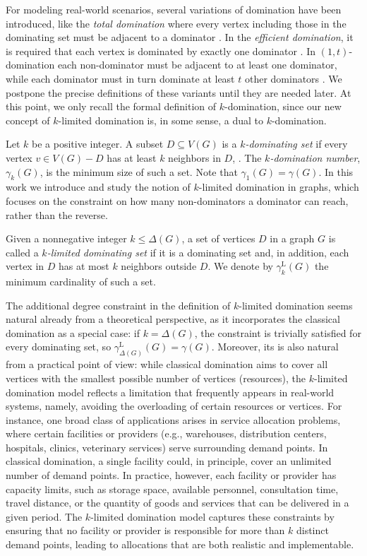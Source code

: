\documentclass[11pt]{article}
\newcommand{\gammakL}{\gamma_k^{\mathrm L}}
\begin{document}
For modeling real-world scenarios, several variations of domination have been introduced, like the \textit{total domination} where every vertex including those in the dominating set must be adjacent to a dominator \cite{MA_Henning}. In the \textit{efficient domination}, it is required that each vertex is dominated by exactly one dominator \cite{HHH4, kpy}. In $(1,t)$-domination each non-dominator must be adjacent to at least one dominator, while each dominator must in turn dominate at least $t$
other dominators \cite{fakhran, favaron}.
We postpone the precise definitions of these variants until they are needed later. At this point, we only recall the formal definition of $k$-domination, since our new concept of $k$-limited domination is, in some sense, a dual to $k$-domination.

Let $k$ be a positive integer. A subset $D\subseteq V(G)$ is a \textit{$k$-dominating set} if every vertex $v\in V(G)- D$ has at least $k$ neighbors in $D$, \cite{Fink}. The \textit{$k$-domination number}, $\gamma_k(G)$, is the minimum size of such a set. Note that $\gamma_1(G)=\gamma(G)$.
In this work we introduce and study the notion of $k$-limited domination in graphs, which focuses on the constraint on how many non-dominators a dominator can reach, rather than the reverse.

Given a nonnegative integer $k \le \Delta(G)$, a set of vertices $D$ in a graph $G$ is called a \emph{$k$-limited dominating set} if it is a dominating set and, in addition, each vertex in $D$ has at most $k$ neighbors outside $D$. We denote by $\gammakL(G)$ the minimum cardinality of such a set.

The additional degree constraint in the definition of $k$-limited domination seems natural already from a theoretical perspective, as it incorporates the classical domination as a special case: if $k=\Delta(G)$, the constraint is trivially satisfied for every dominating set, so $\gamma^{\mathrm L}_{\Delta(G)}(G)=\gamma(G)$.
Moreover, its is also natural from a practical point of view: while classical domination aims to cover all vertices with the smallest possible number of vertices (resources), the $k$-limited domination model reflects a limitation that frequently appears in real-world systems, namely, avoiding the overloading of certain resources or vertices.
For instance, one broad class of applications arises in service allocation problems, where certain facilities or providers (e.g., warehouses, distribution centers, hospitals, clinics, veterinary services) serve surrounding demand points.
In classical domination, a single facility could, in principle, cover an unlimited number of demand points.
In practice, however, each facility or provider has capacity limits, such as storage space, available personnel, consultation time, travel distance, or the quantity of goods and services that can be delivered in a given period.
The $k$-limited domination model captures these constraints by ensuring that no facility or provider is responsible for more than $k$ distinct demand points, leading to allocations that are both realistic and implementable.
\end{document}
